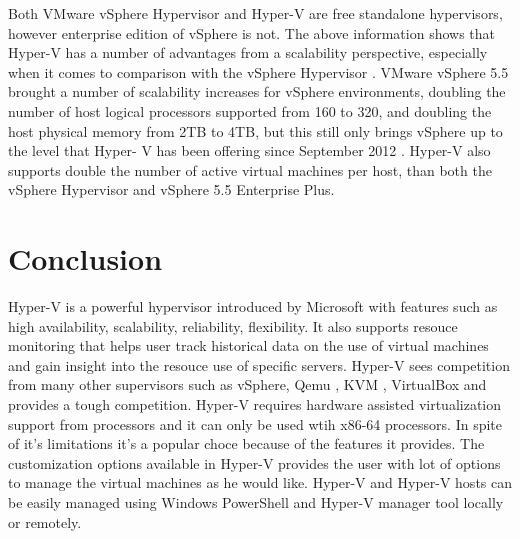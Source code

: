 \documentclass[9pt,twocolumn,twoside]{../../styles/osajnl}
\begin{document}
Both VMware vSphere Hypervisor and Hyper-V are free standalone
hypervisors, however enterprise edition of vSphere is not. The above
information shows that Hyper-V has a number of advantages from a
scalability perspective, especially when it comes to comparison with
the vSphere Hypervisor \cite{www-hyperv-paper}. VMware vSphere 5.5
brought a number of scalability increases for vSphere environments,
doubling the number of host logical processors supported from 160 to
320, and doubling the host physical memory from 2TB to 4TB, but this
still only brings vSphere up to the level that Hyper- V has been
offering since September 2012 \cite{www-hyperv-paper}. Hyper-V also
supports double the number of active virtual machines per host, than
both the vSphere Hypervisor and vSphere 5.5 Enterprise Plus.


\section{Conclusion}

Hyper-V is a powerful hypervisor introduced by Microsoft with features
such as high availability, scalability, reliability, flexibility. It
also supports resouce \SE monitoring that helps user track historical data
on the use of virtual machines and gain insight into the resouce \SE use
of specific servers. Hyper-V sees competition from many other
supervisors such as vSphere, Qemu \CE, KVM \CE, VirtualBox \CE and provides a
tough competition. Hyper-V requires hardware assisted virtualization
support from processors and it can only be used wtih \SE x86-64
processors. In spite of it's limitations it's a popular choce \SE because
of the features it provides. The customization options available in
Hyper-V provides the user with lot of options to manage the virtual
machines as he would like. Hyper-V and Hyper-V hosts can be easily
managed using Windows PowerShell and Hyper-V manager tool locally or
remotely.



\end{document}
